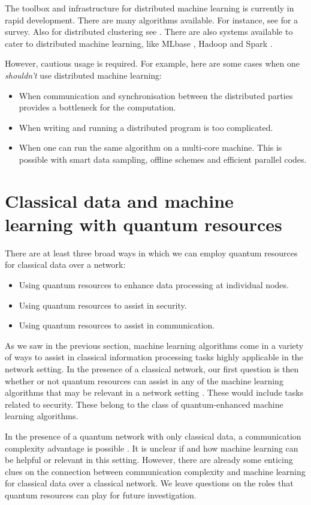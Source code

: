 \documentclass[twocolumn, aps, rmp, amsmath, amssymb, nofootinbib, superscriptaddress, longbibliography, floatfix, table-of-contents, eqsecnum]{revtex4-2}
\begin{document}
The toolbox and infrastructure for distributed machine learning is currently in rapid development. There are many algorithms available. For instance, see \cite{peteiro2013survey} for a survey. Also for distributed clustering see \cite{florian2013}. There are also systems available to cater to distributed machine learning, like MLbase \cite{MLbase}, Hadoop \cite{white2012hadoop} and Spark \cite{shanahan2015large}.

However, cautious usage is required. For example, here are some cases when one \textit{shouldn't} use distributed machine learning:
\begin{itemize}
\item When communication and synchronisation between the distributed parties provides a bottleneck for the computation.
\item When writing and running a distributed program is too complicated.
\item When one can run the same algorithm on a multi-core machine. This is possible with smart data sampling, offline schemes and efficient parallel codes. 
\end{itemize}

\section{Classical data and machine learning with quantum resources}

There are at least three broad ways in which we can employ quantum resources for classical data over a network:
\begin{itemize}
\item Using quantum resources to enhance data processing at individual nodes.
\item Using quantum resources to assist in security.
\item Using quantum resources to assist in communication.
\end{itemize}

As we saw in the previous section, machine learning algorithms come in a variety of ways to assist in classical information processing tasks highly applicable in the network setting. In the presence of a classical network, our first question is then whether or not quantum resources can assist in any of the machine learning algorithms that may be relevant in a network setting . These would include tasks related to security. These belong to the class of quantum-enhanced machine learning algorithms.

In the presence of a quantum network with only classical data, a communication complexity advantage is possible \cite{brassard2003quantum}. It is unclear if and how machine learning can be helpful or relevant in this setting. However, there are already some enticing clues \cite{kane2017communication, balcan2012distributed, conitzer2004communication} on the connection between communication complexity and machine learning for classical data over a classical network. We leave questions on the roles that quantum resources can play for future investigation. 
\end{document}
